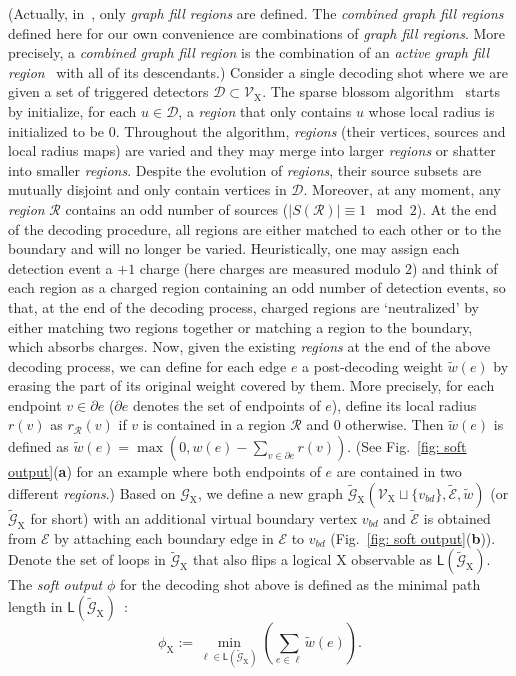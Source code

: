 \documentclass[reprint,aps,twocolumn,superscriptaddress,showpacs,notitlepage,10pt]{revtex4-2}
\theoremstyle{definition}
\begin{document}
  (Actually, in~\cite{higgott_sparse_2025}, only \textit{graph fill regions} are defined. The \textit{
  combined graph fill regions} defined here for our own convenience are combinations of \textit{graph fill regions}. More precisely, a \textit{combined graph fill region} is the combination of an \textit{active graph fill region}~\cite{higgott_sparse_2025} with all of its descendants.)  Consider a single decoding shot where we are given a set of triggered detectors $\mathcal{D} \subset \mathcal{V}_{\mathrm{X}}$.  The sparse blossom algorithm~\cite{higgott_sparse_2025} starts by initialize, for each $u\in\mathcal{D}$, a \textit{region} that only contains $u$ whose local radius is initialized to be $0$. Throughout the algorithm, \textit{regions} (their vertices, sources and local radius maps) are varied and they may merge into larger \textit{regions} or shatter into smaller \textit{regions}. Despite the evolution of \textit{regions}, their source subsets are mutually disjoint and only contain vertices in $\mathcal{D}$. Moreover, at any moment, any \textit{region} $\mathcal{R}$ contains an odd number of sources ($|S(\mathcal{R})|\equiv 1\mod 2$).  At the end of the decoding procedure, all regions are either matched to each other or to the boundary and will no longer be varied. Heuristically, one may assign each detection event a $+1$ charge (here charges are measured modulo $2$) and think of each region as a charged region containing an odd number of detection events, so that, at the end of the decoding process, charged regions are `neutralized' by either matching two regions together or matching a region to the boundary, which absorbs charges. Now, given the existing \textit{regions} at the end of the above decoding process, we can define for each edge $e$ a post-decoding weight $\tilde{w}(e)$ by erasing the part of its original weight covered by them. More precisely, for each endpoint $v\in\partial e$ ($\partial e$ denotes the set of endpoints of $e$), define its local radius $r(v)$ as $r_{\mathcal{R}}(v)$ if $v$ is contained in a region $\mathcal{R}$ and $0$ otherwise. Then $\tilde{w}(e)$ is defined as $\tilde{w}(e)=\max (0,w(e)-\sum_{v\in\partial{e}}r(v))$. (See Fig.~\ref{fig: soft output}(\textbf{a}) for an example where both endpoints of $e$ are contained in two different \textit{regions}.) Based on $\mathcal{G}_{\mathrm{X}}$, we define a new graph $\tilde{\mathcal{G}}_{\mathrm{X}}(\mathcal{V}_{\mathrm{X}}\sqcup \{v_{bd}\},\tilde{\mathcal{E}},\tilde{w})$ (or $\tilde{\mathcal{G}}_{\mathrm{X}}$ for short) with an additional virtual boundary vertex $v_{bd}$ and $\tilde{\mathcal{E}}$ is obtained from $\mathcal{E}$ by attaching each boundary edge in $\mathcal{E}$ to $v_{bd}$ (Fig.~\ref{fig: soft output}(\textbf{b})).  Denote the set of loops in $\tilde{\mathcal{G}}_{\mathrm{X}}$ that also flips a logical $\mathrm{X}$ observable as $\mathsf{L}(\tilde{\mathcal{G}}_{\mathrm{X}})$. The \textit{soft output} $\phi$ for the decoding shot above is defined as the minimal path length in $\mathsf{L}(\tilde{\mathcal{G}}_{\mathrm{X}})$~\cite{meister_efficient_2024}: \[\phi_{\mathrm{X}}:=\min_{\ell\in\mathsf{L}(\tilde{\mathcal{G}}_{\mathrm{X}})} \left(\sum_{e\in\ell}\tilde{w}(e)\right).\]
\end{document}
